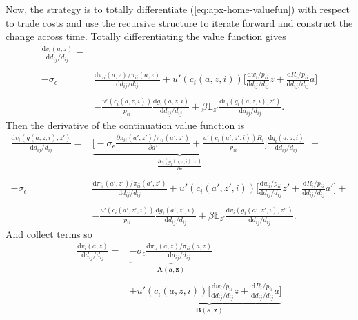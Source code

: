 \documentclass[12pt,pdftex]{article}
\begin{document}
\begin{onehalfspacing}
Now, the strategy is to totally differentiate (\ref{eq:apx-home-valuefun}) with respect to trade costs and use the recursive structure to iterate forward and construct the change across time. Totally differentiating the value function gives
{\small
\begin{align}
\frac{\mathrm{d} v_i(a, z)}{\mathrm{d} d_{ij} / d_{ij}} =& \nonumber  \\
\nonumber \\
-\sigma_{\epsilon} & \frac{\mathrm{d} \pi_{ii}(a,z) / \pi_{ii}(a,z)}{\mathrm{d}d_{ij} / d_{ij}}  + u'(c_{i}(a,z,i)) \bigg[ \frac{\mathrm{d} w_{i} / p_{ii}}{\mathrm{d} d_{ij} / d_{ij}}z  +  \frac{\mathrm{d} R_{i} / p_{ii}}{\mathrm{d} d_{ij} / d_{ij}} a  \bigg] \\
\nonumber  \\
& - \frac{u'(c_{i}(a,z,i))}{p_{ii}}\frac{\mathrm{d} g_{i}(a,z,i)}{\mathrm{d} d_{ij} / d_{ij}} + \beta \mathbb{E}_{z'} \frac{\mathrm{d} v_i(g_{i}(a,z,i), z')}{\mathrm{d} d_{ij} / d_{ij}}.
\end{align}
}
Then the derivative of the continuation value function is
{\small
\begin{align}
\frac{\mathrm{d} v_i(g(a,z,i), z')}{\mathrm{d} d_{ij} / d_{ij}} = &  \underbrace{\bigg [-\sigma_{\epsilon} \frac{\partial \pi_{ii}(a',z') / \pi_{ii}(a',z')}{\partial a'} + \frac{u'(c_{i}(a',z',i))R_{i}}{p_{ii}} \bigg ]}_{\frac{\partial v_i(g_{i}(a,z,i), z')}{\partial a}}\frac{\mathrm{d} g_{i}(a,z,i)}{\mathrm{d} d_{ij} / d_{ij}} \ \ + \\
\nonumber \\
-\sigma_{\epsilon} & \frac{\mathrm{d} \pi_{ii}(a',z') / \pi_{ii}(a',z')}{\mathrm{d}d_{ij} / d_{ij}}  + u'(c_{i}(a',z',i)) \bigg[ \frac{\mathrm{d} w_{i} / p_{ii}}{\mathrm{d} d_{ij} / d_{ij}}z'  +  \frac{\mathrm{d} R_{i} / p_{ii}}{\mathrm{d} d_{ij} / d_{ij}} a'  \bigg] + \\
\nonumber \\
& - \frac{u'(c_{i}(a',z',i))}{p_{ii}}\frac{\mathrm{d} g_{i}(a',z',i)}{\mathrm{d} d_{ij} / d_{ij}}
+ \beta \mathbb{E}_{z'} \frac{\mathrm{d} v_i(g_{i}(a',z',i), z'')}{\mathrm{d} d_{ij} / d_{ij}}.
\end{align}
}
And collect terms so
{\small
\begin{align}
\frac{\mathrm{d} v_i(a, z)}{\mathrm{d} d_{ij} / d_{ij}} =& \underbrace{-\sigma_{\epsilon} \frac{\mathrm{d} \pi_{ii}(a,z) / \pi_{ii}(a,z)}{\mathrm{d}d_{ij} / d_{ij}}}_{\mathbf{A(a,z)}} \\
\nonumber \\
& + \underbrace{u'(c_{i}(a,z,i)) \bigg[ \frac{\mathrm{d} w_{i} / p_{ii}}{\mathrm{d} d_{ij} / d_{ij}}z  +  \frac{\mathrm{d} R_{i} / p_{ii}}{\mathrm{d} d_{ij} / d_{ij}} a  \bigg]}_{\mathbf{B(a,z)}}  \\

\end{align}}
\end{onehalfspacing}
\end{document}
